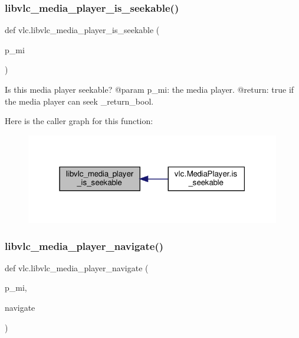 \subsubsection{\texorpdfstring{libvlc\+\_\+media\+\_\+player\+\_\+is\+\_\+seekable()}{libvlc\_media\_player\_is\_seekable()}}
{\footnotesize\ttfamily def vlc.\+libvlc\+\_\+media\+\_\+player\+\_\+is\+\_\+seekable (\begin{DoxyParamCaption}\item[{}]{p\+\_\+mi }\end{DoxyParamCaption})}

\begin{DoxyVerb}Is this media player seekable?
@param p_mi: the media player.
@return: true if the media player can seek \libvlc_return_bool.
\end{DoxyVerb}
 Here is the caller graph for this function\+:
\nopagebreak
\begin{figure}[H]
\begin{center}
\leavevmode
\includegraphics[width=315pt]{namespacevlc_a0dfac2d253dd73294fbc61a21a0dab61_icgraph}
\end{center}
\end{figure}
\mbox{\label{namespacevlc_a1fea7d3530a5c500357969307e5bea7e}} 
\subsubsection{\texorpdfstring{libvlc\+\_\+media\+\_\+player\+\_\+navigate()}{libvlc\_media\_player\_navigate()}}
{\footnotesize\ttfamily def vlc.\+libvlc\+\_\+media\+\_\+player\+\_\+navigate (\begin{DoxyParamCaption}\item[{}]{p\+\_\+mi,  }\item[{}]{navigate }\end{DoxyParamCaption})}

